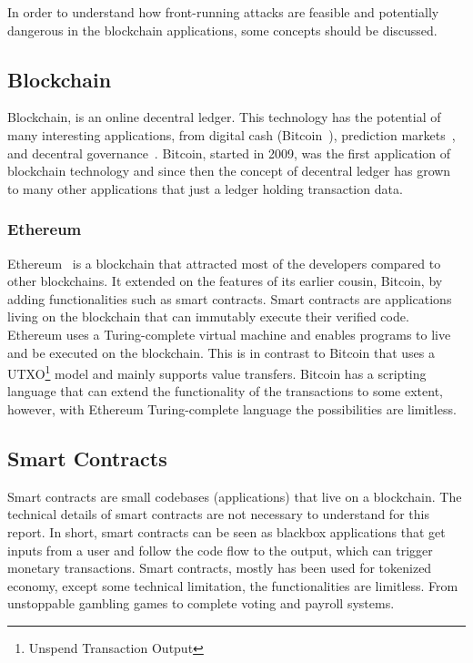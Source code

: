 In order to understand how front-running attacks are feasible and potentially dangerous in the blockchain applications, some concepts should be discussed.  

\subsection{Blockchain}
Blockchain, is an online decentral ledger. This technology has the potential of many interesting applications, from digital cash (\eg Bitcoin~\cite{nakamoto2008bitcoin}), prediction markets~\cite{clark2014decentralizing}, and decentral governance~\cite{aragonwebsite}. Bitcoin, started in 2009, was the first application of blockchain technology and since then the concept of decentral ledger has grown to many other applications that just a ledger holding transaction data. 

\subsubsection{Ethereum}
Ethereum~\cite{wood2014ethereum} is a blockchain that attracted most of the developers compared to other blockchains. It extended on the features of its earlier cousin, Bitcoin, by adding functionalities such as smart contracts. Smart contracts are applications living on the blockchain that can immutably execute their verified code. Ethereum uses a Turing-complete virtual machine and enables programs to live and be executed on the blockchain. This is in contrast to Bitcoin that uses a UTXO\footnote{Unspend Transaction Output} model and mainly supports value transfers. Bitcoin has a scripting language that can extend the functionality of the transactions to some extent, however, with Ethereum Turing-complete language the possibilities are limitless.

\subsection{Smart Contracts}
Smart contracts are small codebases (applications) that live on a blockchain. The technical details of smart contracts are not necessary to understand for this report. In short, smart contracts can be seen as blackbox applications that get inputs from a user and follow the code flow to the output, which can trigger monetary transactions. Smart contracts, mostly has been used for tokenized economy, except some technical limitation, the functionalities are limitless. From unstoppable gambling games to complete voting and payroll systems. 

